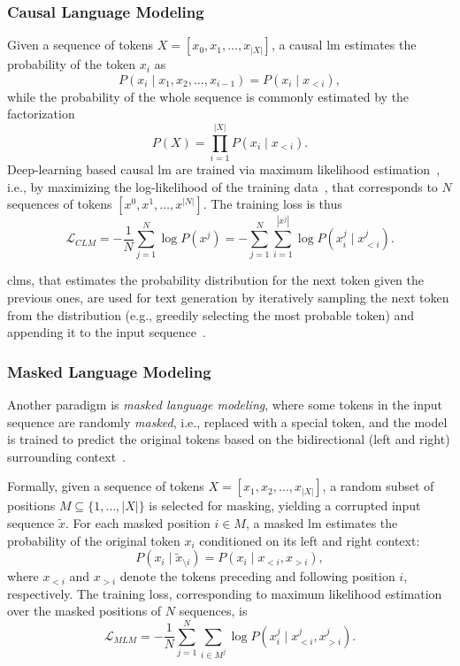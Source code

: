 \subsubsection{Causal Language Modeling}

Given a sequence of tokens $X = [x_0, x_1, \ldots, x_{|X|}]$, a causal \ac{lm} estimates the probability of the token $x_i$ as
\begin{equation}
    P(x_i \mid x_1, x_2, \ldots, x_{i-1}) = P(x_i \mid x_{<i}),
\end{equation}
while the probability of the whole sequence is commonly estimated by the factorization~\cite{jain-etal-2023-cl-for-causal-lm,jm3}
\begin{equation}
    P(X) = \prod_{i=1}^{|X|} P(x_i \mid x_{<i}).
\end{equation}
Deep-learning based causal \ac{lm} are trained via maximum likelihood estimation~\cite{jain-etal-2023-cl-for-causal-lm}, i.e., by maximizing the log-likelihood of the training data~\cite{MLE_tutorial}, that corresponds to $N$ sequences of tokens $[x^0, x^1, \ldots, x^|N|]$. The training loss is thus
\begin{equation}
    \mathcal{L}_{CLM} = - \frac{1}{N} \sum_{j=1}^{N} \log P(x^j) = - \sum_{j=1}^{N} \sum_{i=1}^{|x^j|} \log P(x_i^j \mid x_{<i}^j).
\end{equation}

\Aclp{clm}, that estimates the probability distribution for the next token given the previous ones, are used for text generation by iteratively sampling the next token from the distribution (e.g., greedily selecting the most probable token) and appending it to the input sequence~\cite{jm3}. 

\subsubsection{Masked Language Modeling}

Another paradigm is \emph{masked language modeling}, where some tokens in the input sequence are randomly \emph{masked}, i.e., replaced with a special token, and the model is trained to predict the original tokens based on the bidirectional (left and right) surrounding context~\cite{devlin-etal-2019-bert}.

Formally, given a sequence of tokens $X = [x_1, x_2, \ldots, x_{|X|}]$, a random subset of positions 
$M \subseteq \{1, \ldots, |X|\}$ is selected for masking, yielding a corrupted input sequence $\tilde{x}$. 
For each masked position $i \in M$, a masked \ac{lm} estimates the probability of the original token $x_i$ conditioned on its left and right context:
\begin{equation}
    P(x_i \mid \tilde{x}_{\setminus i}) = P(x_i \mid x_{<i}, x_{>i}),
\end{equation}
where $x_{<i}$ and $x_{>i}$ denote the tokens preceding and following position $i$, respectively. 
The training loss, corresponding to maximum likelihood estimation over the masked positions of $N$ sequences, is
\begin{equation}
    \mathcal{L}_{MLM} = - \frac{1}{N} \sum_{j=1}^{N} \sum_{i \in M^j} \log P(x_i^j \mid x_{<i}^j, x_{>i}^j).
\end{equation}

